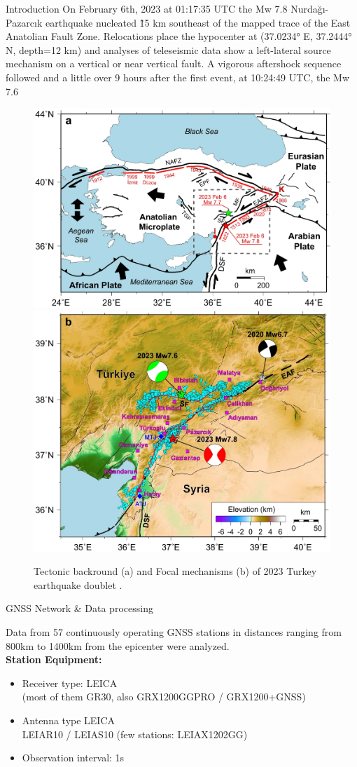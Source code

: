 \documentclass[final,a0,portrait]{beamer}
\newlength{\onecolwid}
\begin{document}
\begin{frame}[t]
\begin{columns}[t]
\begin{column}{\onecolwid}
\begin{block}{Introduction}
{\small
On February 6th, 2023 at 01:17:35 UTC the Mw 7.8 Nurdağı-Pazarcık earthquake nucleated \~15 km southeast of the mapped trace of the East Anatolian Fault Zone. Relocations  place the hypocenter at (37.0234° E, 37.2444° N, depth=12 km) and analyses of teleseismic data show a left-lateral source mechanism on a vertical or near vertical fault. A vigorous aftershock sequence followed and a little over 9 hours after the first event, at 10:24:49 UTC, the Mw 7.6 \cite{Melgar_2023}
}
\begin{figure}
\begin{center}
  \includegraphics[width=.54\textwidth]{figures/eqturk23_tect.png}
  \includegraphics[width=.44\textwidth]{figures/eqturk23_fm.png}
\end{center}
    \caption{Tectonic backround (a) and Focal mechanisms (b) of 2023 Turkey earthquake doublet \cite{Liu_2023}.}
    \label{fig:proc-net}
\end{figure} 
\end{block}
\begin{block}{GNSS Network \& Data processing}
{\small
Data from 57 continuously operating GNSS stations in distances ranging from 800km to 1400km from the epicenter were analyzed.\\
\textbf{Station Equipment:}
\begin{itemize}\setlength\itemsep{.3em}
  \item Receiver type: LEICA\\
    (most of them GR30, also GRX1200GGPRO / GRX1200+GNSS)
  \item Antenna type LEICA\\
    LEIAR10 / LEIAS10 (few stations: LEIAX1202GG)
  \item Observation interval: 1s
\end{itemize}

}
\end{block}
\end{column}
\end{columns}
\end{frame}
\end{document}
